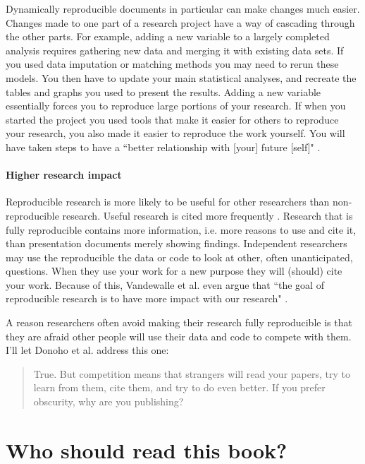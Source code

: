Dynamically reproducible documents in particular can make changes much easier. Changes made to one part of a research project have a way of cascading through the other parts. For example, adding a new variable to a largely completed analysis requires gathering new data and merging it with existing data sets. If you used data imputation or matching methods you may need to rerun these models. You then have to update your main statistical analyses, and recreate the tables and graphs you used to present the results. Adding a new variable essentially forces you to reproduce large portions of your research. If when you started the project you used tools that make it easier for others to reproduce your research, you also made it easier to reproduce the work yourself. You will have taken steps to have a ``better relationship with [your] future [self]" \cite[]{Bowers2011}.

\paragraph{Higher research impact}
Reproducible research is more likely to be useful for other researchers than non-reproducible research. Useful research is cited more frequently \cite[]{Donoho2002,Vandewalle2012}. Research that is fully reproducible contains more information, i.e. more reasons to use and cite it, than presentation documents merely showing findings. Independent researchers may use the reproducible the data or code to look at other, often unanticipated, questions. When they use your work for a new purpose they will (should) cite your work. Because of this, Vandewalle et al. even argue that ``the goal of reproducible research is to have more impact with our research"  \citeyearpar[1253]{Vandewalle2007}.

A reason researchers often avoid making their research fully reproducible is that they are afraid other people will use their data and code to compete with them. I'll let Donoho et al. address this one:

\begin{quote}
    True. But competition means that strangers will read your papers, try to learn from them, cite them, and try to do even better. If you prefer obscurity, why are you publishing? \citeyearpar[16]{Donoho2009}
\end{quote}

\section{Who should read this book?}

